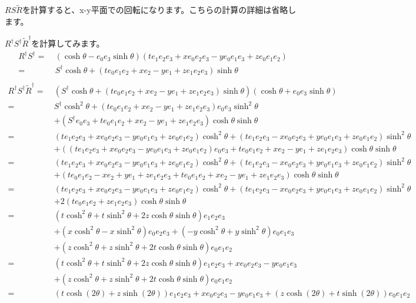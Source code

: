 \documentclass[a4paper,12pt,notitlepage]{jsreport}
\begin{document}
$RS\widetilde{R}$を計算すると、x-y平面での回転になります。こちらの計算の詳細は省略します。

$R^\dag S^\dag\widetilde{R}^\dag$を計算してみます。
\begin{equation}
  \begin{split}
    R^\dag S^\dag=~&(\cosh\theta-e_0e_3\sinh\theta)
    (t e_1e_2e_3 + x e_0e_2e_3 - y e_0e_1e_3 + z e_0e_1e_2) \\
    = ~ & S^\dag \cosh \theta + (t e_0e_1e_2 + x e_2 - y e_1 + z  e_1e_2e_3) \sinh \theta \\
  \end{split}
\end{equation}
\begin{equation}
  \begin{split}
    R^\dag S^\dag \widetilde{R}^\dag = ~ & (S^\dag \cosh \theta
    + (t e_0e_1e_2 + x e_2 - y e_1 + z e_1e_2e_3)\sinh \theta)(\cosh \theta + e_0e_3 \sinh \theta)\\
    =~&S^\dag\cosh^2\theta+(te_0e_1e_2+xe_2-ye_1+ze_1e_2e_3)e_0e_3\sinh^2\theta\\
    &+(S^\dag e_0e_3+te_0e_1e_2+xe_2-ye_1+ze_1e_2e_3)\cosh\theta\sinh\theta\\
    =~&(te_1e_2e_3+xe_0e_2e_3-ye_0e_1e_3+ze_0e_1e_2)\cosh^2\theta+(te_1e_2e_3-xe_0e_2e_3+ye_0e_1e_3+ze_0e_1e_2)\sinh^2\theta\\
    &+((te_1e_2e_3+xe_0e_2e_3-ye_0e_1e_3+ze_0e_1e_2)e_0e_3+te_0e_1e_2+xe_2-ye_1+ze_1e_2e_3)\cosh\theta\sinh\theta\\
    =~&(te_1e_2e_3+xe_0e_2e_3-ye_0e_1e_3+ze_0e_1e_2)\cosh^2\theta+(te_1e_2e_3-xe_0e_2e_3+ye_0e_1e_3+ze_0e_1e_2)\sinh^2\theta\\
    &+(te_0e_1e_2-xe_2+ye_1+ze_1e_2e_3+te_0e_1e_2+xe_2-ye_1+ze_1e_2e_3)\cosh\theta\sinh\theta\\
    =~&(te_1e_2e_3+xe_0e_2e_3-ye_0e_1e_3+ze_0e_1e_2)\cosh^2\theta+(te_1e_2e_3-xe_0e_2e_3+ye_0e_1e_3+ze_0e_1e_2)\sinh^2\theta\\
    &+2(te_0e_1e_2+ze_1e_2e_3)\cosh\theta\sinh\theta\\
    =~&(t\cosh^2\theta+t\sinh^2\theta+2z\cosh\theta\sinh\theta)e_1e_2e_3\\
    &+(x\cosh^2\theta-x\sinh^2\theta)e_0e_2e_3+(-y\cosh^2\theta+y\sinh^2\theta)e_0e_1e_3\\
    &+(z\cosh^2\theta+z\sinh^2\theta+2t\cosh\theta\sinh\theta)e_0e_1e_2\\
    =~&(t\cosh^2\theta+t\sinh^2\theta+2z\cosh\theta\sinh\theta)e_1e_2e_3+xe_0e_2e_3-ye_0e_1e_3\\
    &+(z\cosh^2\theta+z\sinh^2\theta+2t\cosh\theta\sinh\theta)e_0e_1e_2\\
    =~&(t\cosh(2\theta)+z\sinh(2\theta))e_1e_2e_3+xe_0e_2e_3-ye_0e_1e_3
    +(z\cosh(2\theta)+t\sinh(2\theta))e_0e_1e_2\\
  \end{split}
\end{equation}
\end{document}
